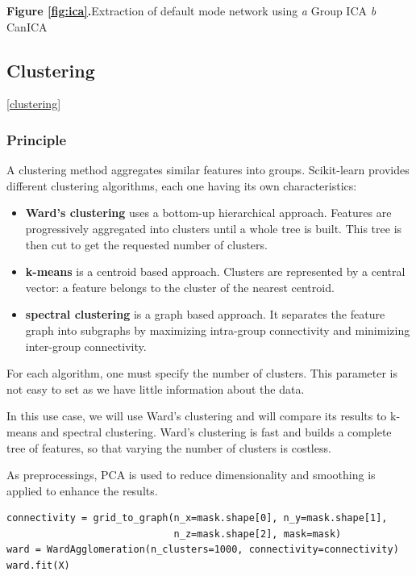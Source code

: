\documentclass{frontiersSCNS} %
\newcommand{\alex}[1]{\todo[inline, color=green!40]{#1}}
\begin{document}
\textbf{Figure \ref{fig:ica}.}{Extraction of default mode network using \textit{a} Group ICA
  \textit{b} CanICA}\label{fig:03}

\alex{MELODIC is missing}

\subsection{Clustering}
\ref{clustering}
\subsubsection{Principle}

A clustering method aggregates similar features into groups. Scikit-learn
provides different clustering algorithms, each one having its own
characteristics:

\begin{itemize}
    \item{\bf Ward's clustering} uses a bottom-up hierarchical approach. Features are
        progressively aggregated into clusters until a whole tree is built. This
        tree is then cut to get the requested number of clusters.
    \item{\bf k-means} is a centroid based approach. Clusters are represented by
        a central vector: a feature belongs to the cluster of the nearest
        centroid.
    \item{\bf spectral clustering} is a graph based approach. It separates
        the feature graph into subgraphs by maximizing intra-group connectivity and
        minimizing inter-group connectivity.
\end{itemize}

For each algorithm, one must specify the number of clusters. This parameter is
not easy to set as we have little information about the data.

In this use case, we will use Ward's clustering and will compare its results to
k-means and spectral clustering. Ward's clustering is fast and builds a complete
tree of features, so that varying the number of clusters is costless.

As preprocessings, PCA is used to reduce dimensionality and smoothing is applied
to enhance the results.

\begin{lstlisting}
connectivity = grid_to_graph(n_x=mask.shape[0], n_y=mask.shape[1],
                             n_z=mask.shape[2], mask=mask)
ward = WardAgglomeration(n_clusters=1000, connectivity=connectivity)
ward.fit(X)
\end{lstlisting}
\end{document}
